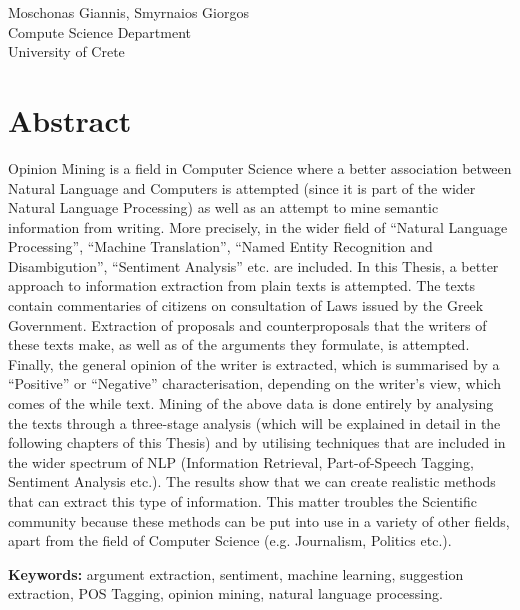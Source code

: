 Moschonas Giannis, Smyrnaios Giorgos\\
Compute Science Department\\
University of Crete \setlength{\parskip}{0.5cm}

\thispagestyle{plain}			%
\setlength{\parskip}{0pt plus 1.0pt}
\section*{Abstract}
Opinion Mining is a field in Computer Science where a better association between Natural Language and Computers is attempted (since it is part of the wider Natural Language Processing) as well as an attempt to mine semantic information from writing. More precisely, in the wider field of ``Natural Language Processing'', ``Machine Translation'', ``Named Entity Recognition and Disambigution'', ``Sentiment Analysis'' etc. are included. In this Thesis, a better approach to information extraction from plain texts is attempted. The texts contain commentaries of citizens on consultation of Laws issued by the Greek Government. Extraction of proposals and counterproposals that the writers of these texts make, as well as of the arguments they formulate, is attempted. Finally, the general opinion of the writer is extracted, which is summarised by a ``Positive'' or ``Negative'' characterisation, depending on  the writer's view, which comes of the while text. Mining of the above data is done entirely by analysing the texts through a three-stage analysis (which will be explained in detail in the following chapters of this Thesis) and by utilising techniques that are included in the wider spectrum of NLP (Information Retrieval, Part-of-Speech Tagging, Sentiment Analysis etc.). The results show that we can create realistic methods that can extract this type of information. This matter troubles the Scientific community because these methods can be put into use in a variety of other fields, apart from the field of Computer Science (e.g. Journalism, Politics etc.).





\vfill
\textbf{Keywords:} argument extraction, sentiment, machine learning, suggestion extraction, POS Tagging, opinion mining, natural language processing.
